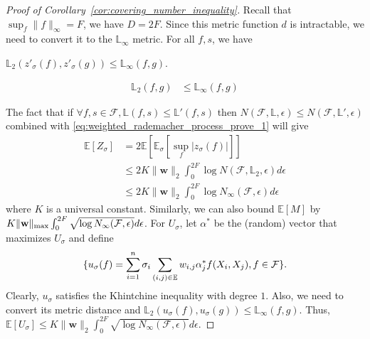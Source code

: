 \documentclass[letterpaper]{article} %
\def\DoubleColumn{}
\def\DoubleColumnEnd{}
\def\SingleColumn{}
\def\SingleColumnEnd{}
\newcommand{\E}{\mathbb{E}}
\newcommand{\weight}{\mathbf{w}}
\newcommand{\rademacher}{\sigma}
\newcommand{\pair}[1]{(#1)}
\newcommand{\lnorm}{\mathbb{L}}
\begin{document}
\begin{proof}[Proof of Corollary~\ref{cor:covering_number_inequality}]
Recall that $\sup_f \|f\|_\infty = F$, we have $D= 2F$.
Since this metric function $d$ is intractable, we need to convert it to the $\lnorm_\infty$ metric. For all $f,s$, we have
\DoubleColumn
$\lnorm{}_2(z'_\rademacher{}(f),z'_\rademacher{}(g))\le \lnorm_\infty(f,g)$.
\DoubleColumnEnd
\SingleColumn
\begin{align*}
    \lnorm{}_2(f,g)&\le \lnorm_\infty(f,g)
\end{align*}
\SingleColumnEnd
The fact that if $\forall f,s\in\mathcal F, \lnorm{}(f,s)\le \lnorm{}'(f,s)$ then $N(\mathcal F,\lnorm{},\epsilon)\le N(\mathcal F, \lnorm{}',\epsilon)$ combined with \eqref{eq:weighted_rademacher_process_prove_1} will give
\begin{align*}
    \E[Z_\rademacher]&= 2\E[\E_\rademacher[\sup_f|z_\rademacher(f)|]]\\
    &\le 2K\|\weight{}\|_2\int_0^{2F}\log N(\mathcal F,\lnorm{}_2,\epsilon)d\epsilon\\
    &\le 2K\|\weight{}\|_2\int_0^{2F}\log N_\infty(\mathcal F, \epsilon)d\epsilon
\end{align*}
where $K$ is a universal constant. Similarly, we can also bound $\E[M]$ by $K\|\weight{}\|_{\max}\linebreak\int_0^{2F}\sqrt{\log N_\infty(\mathcal F, \epsilon)}d\epsilon$. 
For $U_\rademacher$, let $\alpha^*$ be the (random) vector that maximizes $U_\rademacher$ and define
\[\{u_\rademacher(f) = \sum_{i=1}^n\rademacher_i\sum_{\pair{i,j}\in\E}w_{i,j}\alpha_j^*\linebreak f(X_i,X_j),f\in\mathcal{F}\}.\]
Clearly, $u_\rademacher$ satisfies the Khintchine inequality with degree $1$. Also, we need to convert its metric distance and $\lnorm{}_2(u_\rademacher{}(f), u_\rademacher{}(g))\le \lnorm{}_\infty(f, g)$.
Thus, $\E[U_\rademacher]\le K\|\weight{}\|_2\int_0^{2F}\sqrt{\log N_\infty(\mathcal F,\epsilon)}d\epsilon$.


\end{proof}
\end{document}
